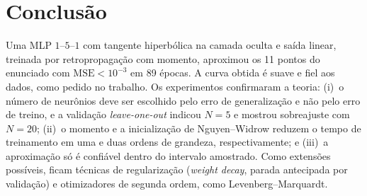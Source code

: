 \documentclass[12pt,oneside,a4paper,english,brazil]{abntex2}
\newcommand{\mse}{\mathrm{MSE}}
\begin{document}
\section{Conclusão}
Uma MLP $1$--$5$--$1$ com tangente hiperbólica na camada oculta e saída
linear, treinada por retropropagação com momento, aproximou os 11 pontos do
enunciado com $\mse<10^{-3}$ em 89 épocas. A curva obtida é suave e fiel aos
dados, como pedido no trabalho. Os experimentos confirmaram a teoria:
(i)~o número de neurônios deve ser escolhido pelo erro de generalização e
não pelo erro de treino, e a validação \emph{leave-one-out} indicou $N=5$ e
mostrou sobreajuste com $N=20$;
(ii)~o momento e a inicialização de Nguyen--Widrow reduzem o tempo de
treinamento em uma e duas ordens de grandeza, respectivamente; e
(iii)~a aproximação só é confiável dentro do intervalo amostrado. Como
extensões possíveis, ficam técnicas de regularização (\textit{weight decay},
parada antecipada por validação) e otimizadores de segunda ordem, como
Levenberg--Marquardt.

\postextual

\end{document}
